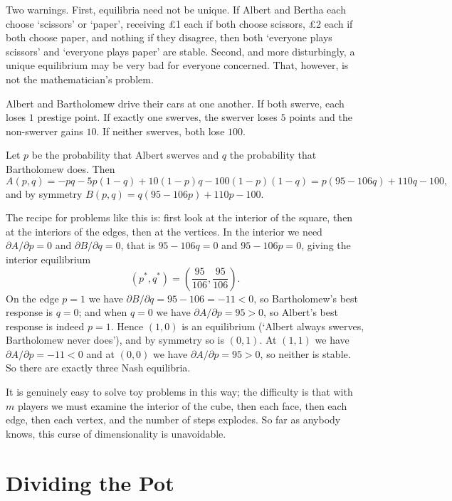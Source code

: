 Two warnings. First, equilibria need not be unique. If Albert and Bertha each choose `scissors' or `paper', receiving \pounds 1 each if both choose scissors, \pounds 2 each if both choose paper, and nothing if they disagree, then both `everyone plays scissors' and `everyone plays paper' are stable. Second, and more disturbingly, a unique equilibrium may be very bad for everyone concerned. That, however, is not the mathematician's problem.

\begin{example}[Chicken]
	Albert and Bartholomew drive their cars at one another. If both swerve, each loses $1$ prestige point. If exactly one swerves, the swerver loses $5$ points and the non-swerver gains $10$. If neither swerves, both lose $100$.

	Let $p$ be the probability that Albert swerves and $q$ the probability that Bartholomew does. Then
	$$A(p,q) = -pq - 5p(1-q) + 10(1-p)q - 100(1-p)(1-q) = p(95 - 106q) + 110q - 100,$$
	and by symmetry $B(p,q) = q(95-106p) + 110p - 100$.

	The recipe for problems like this is: first look at the interior of the square, then at the interiors of the edges, then at the vertices. In the interior we need $\partial A/\partial p = 0$ and $\partial B/\partial q = 0$, that is $95 - 106q = 0$ and $95-106p=0$, giving the interior equilibrium
	$$(p^*,q^*) = \left(\frac{95}{106},\frac{95}{106}\right).$$
	On the edge $p = 1$ we have $\partial B/\partial q = 95-106 = -11 < 0$, so Bartholomew's best response is $q = 0$; and when $q = 0$ we have $\partial A/\partial p = 95 > 0$, so Albert's best response is indeed $p=1$. Hence $(1,0)$ is an equilibrium (`Albert always swerves, Bartholomew never does'), and by symmetry so is $(0,1)$. At $(1,1)$ we have $\partial A /\partial p = -11 <0$ and at $(0,0)$ we have $\partial A/\partial p = 95 > 0$, so neither is stable. So there are exactly three Nash equilibria.
\end{example}

It is genuinely easy to solve toy problems in this way; the difficulty is that with $m$ players we must examine the interior of the cube, then each face, then each edge, then each vertex, and the number of steps explodes. So far as anybody knows, this curse of dimensionality is unavoidable.

\section{Dividing the Pot}

